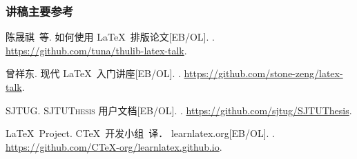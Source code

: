 \begin{frame}
  \frametitle{讲稿主要参考}
  \begin{bibliolist}{00}
    \onlineitem 陈晟祺~等.
    \newblock 如何使用 \LaTeX\ 排版论文[EB/OL].
    . \url{https://github.com/tuna/thulib-latex-talk}.

    \onlineitem 曾祥东.
    \newblock 现代 \LaTeX\ 入门讲座[EB/OL].
    . \url{https://github.com/stone-zeng/latex-talk}.

    \onlineitem \textsc{SJTUG}.
    \newblock \textsc{SJTUThesis} 用户文档[EB/OL].
    . \url{https://github.com/sjtug/SJTUThesis}.

    \onlineitem \LaTeX\ Project.
    C\TeX\ 开发小组~译．
    \newblock learnlatex.org[EB/OL].
    . \url{https://github.com/CTeX-org/learnlatex.github.io}.

  \end{bibliolist}
\end{frame}





\def\bottomthanks{Happy \TeX{}ing!}
\makebottom